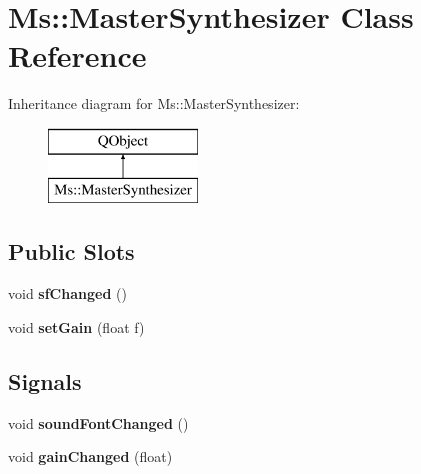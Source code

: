 \hypertarget{class_ms_1_1_master_synthesizer}{}\section{Ms\+:\+:Master\+Synthesizer Class Reference}
\label{class_ms_1_1_master_synthesizer}
Inheritance diagram for Ms\+:\+:Master\+Synthesizer\+:\begin{figure}[H]
\begin{center}
\leavevmode
\includegraphics[height=2.000000cm]{class_ms_1_1_master_synthesizer}
\end{center}
\end{figure}
\subsection*{Public Slots}
\begin{DoxyCompactItemize}
\item 
\mbox{\label{class_ms_1_1_master_synthesizer_ab00b974e6b02d566abd96bd7c2f93505}} 
void {\bfseries sf\+Changed} ()
\item 
\mbox{\label{class_ms_1_1_master_synthesizer_a4b099efbb95acba50ddb9ee4610f1930}} 
void {\bfseries set\+Gain} (float f)
\end{DoxyCompactItemize}
\subsection*{Signals}
\begin{DoxyCompactItemize}
\item 
\mbox{\label{class_ms_1_1_master_synthesizer_a6f77b2aa35acc07d802ae3c3b7bc58e8}} 
void {\bfseries sound\+Font\+Changed} ()
\item 
\mbox{\label{class_ms_1_1_master_synthesizer_aea578ced060ec44f9a6d51b9cf4a8a44}} 
void {\bfseries gain\+Changed} (float)
\end{DoxyCompactItemize}
